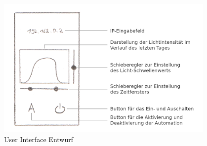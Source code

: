 \begin{figure}[H]
	\centering
	\includegraphics[width=0.95\textwidth]{resources/own_content/App_Design_Description}
	\caption{User Interface Entwurf \cite{LeIn}}
	\label{img:design_interface}
\end{figure}



